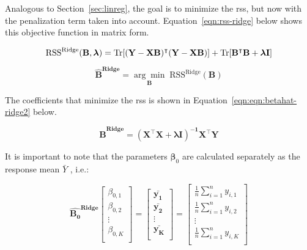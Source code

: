 Analogous to Section~\ref{sec:linreg}, the goal is to minimize the \acrshort{rss}, but now with the penalization term taken into account. Equation~\ref{eqn:rss-ridge} below shows this objective function in matrix form.

\begin{equation} 
	\label{eqn:rss-ridge}
	\text{RSS}^{\text{Ridge}}(\mathbf{B, \boldsymbol{\lambda} }) = \operatorname{Tr} [\mathbf{(Y-XB)^\intercal (Y-XB)}] + \operatorname{Tr}[\mathbf{B^\intercal B + \boldsymbol{\lambda} I}]
\end{equation}

\begin{equation}
	\label{eqn:ridgebetahat}
	\mathbf{\hat{B}^\text{Ridge}} = \underset{\mathbf{B}}{\arg\min} 	\; \text{RSS}^{\text{Ridge}}(\mathbf{B})
\end{equation}	

The coefficients that minimize the \acrshort{rss} is shown in Equation~\ref{eqn:eqn:betahat-ridge2} below.

\begin{equation}
	\label{eqn:ridgebetahat2}
	\mathbf{\hat{B}^\text{Ridge}} = \mathbf{(X^\intercal X + \boldsymbol{\lambda}  I )^{-1} X^\intercal Y}
\end{equation}

It is important to note that the parameters $\boldsymbol{\beta}_0$ are calculated separately as the response mean $\bar{Y}$ \parencite{friedman2001}, i.e.:

\begin{equation}
	\label{eqn:ridge-betazero}
		\mathbf{\hat{B_0}^\text{Ridge}} 
		\begin{bmatrix}
			
			\beta_{0,1}\\
			\beta_{0,2}\\
			\vdots \\
			\beta_{0,K}\\
		\end{bmatrix}
	=
	\begin{bmatrix}
		
		\mathbf{\bar{y_1}}\\
		\mathbf{\bar{y_2}}\\
		\vdots \\
		\mathbf{\bar{y_K}}\\
	\end{bmatrix}
	=
	\begin{bmatrix}
		
		\frac{1}{n}\sum_{i = 1}^{n} y_{i,1}\\
		\frac{1}{n}\sum_{i = 1}^{n} y_{i,2}\\
		\vdots \\
		\frac{1}{n}\sum_{i = 1}^{n} y_{i,K}\\
	\end{bmatrix} 
\end{equation}

